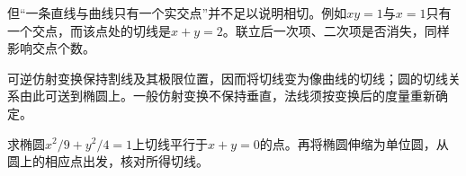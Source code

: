 但“一条直线与曲线只有一个实交点”并不足以说明相切。例如\(xy=1\)与\(x=1\)只有一个交点，而该点处的切线是\(x+y=2\)。联立后一次项、二次项是否消失，同样影响交点个数。

可逆仿射变换保持割线及其极限位置，因而将切线变为像曲线的切线；圆的切线关系由此可送到椭圆上。一般仿射变换不保持垂直，法线须按变换后的度量重新确定。

\vspace{6pt}



\par\noindent\begin{minipage}{\linewidth}
\begin{example}
求椭圆\(x^2/9+y^2/4=1\)上切线平行于\(x+y=0\)的点。再将椭圆伸缩为单位圆，从圆上的相应点出发，核对所得切线。
\end{example}
\end{minipage}\par

%
%
%
%
%



